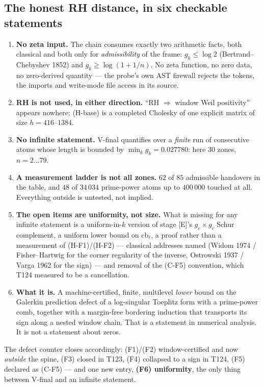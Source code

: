 \documentclass[11pt,a4paper]{article}
\begin{document}
\subsection{The honest RH distance, in six checkable statements}
\begin{enumerate}[leftmargin=2.4em,label=\textbf{(R\arabic*)}]
\item \textbf{No zeta input.} The chain consumes exactly two arithmetic facts, both classical and
both only for \emph{admissibility} of the frame: $g_k\le\log2$ (Bertrand--Chebyshev 1852) and
$g_k\ge\log(1+1/n)$. No zeta function, no zero data, no zero-derived quantity --- the probe's own AST
firewall rejects the tokens, the imports and write-mode file access in its source.
\item \textbf{RH is not used, in either direction.} ``RH $\Rightarrow$ window Weil positivity''
appears nowhere; (H-base) is a completed Cholesky of one explicit matrix of size $h=416$--$1384$.
\item \textbf{No infinite statement.} V-final quantifies over a \emph{finite} run of consecutive
atoms whose length is bounded by $\min_kg_k=0.027780$: here $30$ zones, $n=2\ldots79$.
\item \textbf{A measurement ladder is not all zones.} $62$ of $85$ admissible handovers in the table,
and $48$ of $34\,034$ prime-power atoms up to $400\,000$ touched at all. Everything outside is
untested, not implied.
\item \textbf{The open items are uniformity, not size.} What is missing for any infinite statement is
a uniform-in-$k$ version of stage [E]'s $g_c\times g_c$ Schur complement, a uniform lower bound on
$\mathrm{cb}_\ell$, a proof rather than a measurement of (H-F1)/(H-F2) --- classical addresses named
(Widom 1974 / Fisher--Hartwig for the corner regularity of the inverse, Ostrowski 1937 / Varga 1962
for the sign) --- and removal of the (C-F5) convention, which T124 measured to be a cancellation.
\item \textbf{What it is.} A machine-certified, finite, multilevel \emph{lower} bound on the Galerkin
prediction defect of a log-singular Toeplitz form with a prime-power comb, together with a
margin-free bordering induction that transports its sign along a nested window chain. That is a
statement in numerical analysis. It is not a statement about zeros.
\end{enumerate}

\noindent The defect counter closes accordingly: (F1)/(F2) window-certified and now \emph{outside}
the spine, (F3) closed in T123, (F4) collapsed to a sign in T124, (F5) declared as (C-F5) --- and one
new entry, \textbf{(F6) uniformity}, the only thing between V-final and an infinite statement.
\end{document}
